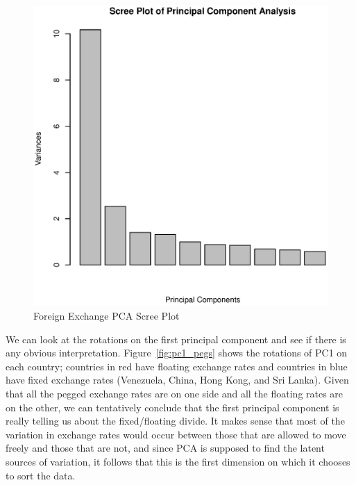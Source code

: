 \documentclass[11pt, fleqn]{article}
\begin{document}
\begin{figure}[!htb]
  \centering
  \includegraphics[scale=.5]{screeplot.eps}
  \caption{Foreign Exchange PCA Scree Plot}
  \label{fig:screeplot}
\end{figure} 

We can look at the rotations on the first principal component and see if there is any obvious interpretation. Figure~\ref{fig:pc1_pegs} shows the rotations of PC1 on each country; countries in red have floating exchange rates and countries in blue have fixed exchange rates (Venezuela, China, Hong Kong, and Sri Lanka). Given that all the pegged exchange rates are on one side and all the floating rates are on the other, we can tentatively conclude that the first principal component is really telling us about the fixed/floating divide. It makes sense that most of the variation in exchange rates would occur between those that are allowed to move freely and those that are not, and since PCA is supposed to find the latent sources of variation, it follows that this is the first dimension on which it chooses to sort the data.
\end{document}
